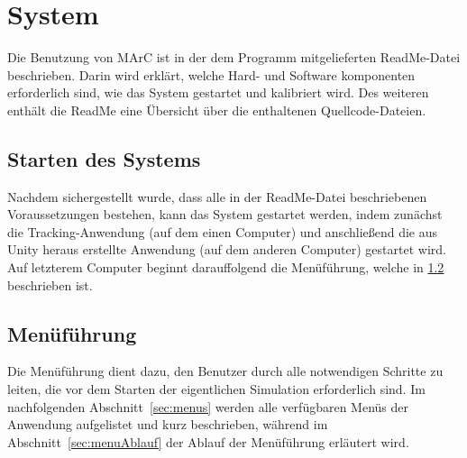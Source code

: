 \section{System}
Die Benutzung von MArC ist in der dem Programm mitgelieferten ReadMe-Datei beschrieben. Darin wird erklärt, welche Hard- und Software komponenten erforderlich sind, wie das System gestartet und kalibriert wird. Des weiteren enthält die ReadMe eine Übersicht über die enthaltenen Quellcode-Dateien.
\subsection{Starten des Systems}
Nachdem sichergestellt wurde, dass alle in der ReadMe-Datei beschriebenen Voraussetzungen bestehen, kann das System gestartet werden, indem zunächst die Tracking-Anwendung (auf dem einen Computer) und anschließend die aus Unity heraus erstellte Anwendung (auf dem anderen Computer) gestartet wird. Auf letzterem Computer beginnt darauffolgend die Menüführung, welche in \ref{sec:menu} beschrieben ist. 
\subsection{Menüführung}\label{sec:menu}
Die Menüführung dient dazu, den Benutzer durch alle notwendigen Schritte zu leiten, die vor dem Starten der eigentlichen Simulation erforderlich sind. Im nachfolgenden Abschnitt~\ref{sec:menus} werden alle verfügbaren Menüs der Anwendung aufgelistet und kurz beschrieben, während im Abschnitt~\ref{sec:menuAblauf} der Ablauf der Menüführung erläutert wird.

